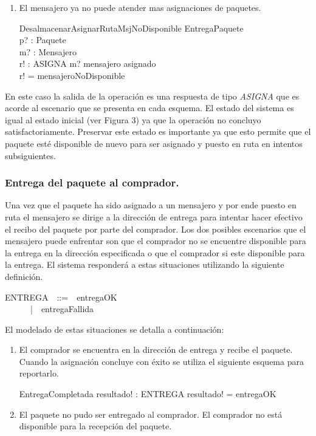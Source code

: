 \documentclass[12pt,a4paper]{article}
\begin{document}
\begin{enumerate}
\begin{enumerate}
\item El mensajero ya no puede atender mas asignaciones de paquetes.
\begin{schema}{DesalmacenarAsignarRutaMsjNoDisponible}
\Xi EntregaPaquete\\
p? : Paquete\\
m? : Mensajero\\
r! : ASIGNA
\where
m? \notin mensajero \setminus \ran asignado\\
r! = mensajeroNoDisponible
\end{schema}

\end{enumerate}
\end{enumerate}

En este caso la salida de la operación es una respuesta de tipo \textit{ASIGNA} que es acorde al escenario que se presenta en cada esquema. El estado del sistema es igual al estado inicial (ver Figura 3) ya que la operación no concluyo satisfactoriamente. Preservar este estado es importante ya que esto permite que el paquete esté disponible de nuevo para ser asignado y puesto en ruta en intentos subsiguientes.

\subsubsection{Entrega del paquete al comprador.}
Una vez que el paquete ha sido asignado a un mensajero y por ende puesto en ruta el mensajero se dirige a la dirección de entrega para intentar hacer efectivo el recibo del paquete por parte del comprador. Los dos posibles escenarios que el mensajero puede enfrentar son que el comprador no se encuentre disponible para la entrega en la dirección especificada o que el comprador si este disponible para la entrega. El sistema responderá a estas situaciones utilizando la siguiente definición.

\begin{zed}
ENTREGA~~::=~~entregaOK\\
~~~~~~|~~entregaFallida
\end{zed}

El modelado de estas situaciones se detalla a continuación:

\begin{enumerate}
\item El comprador se encuentra en la dirección de entrega y recibe el paquete. Cuando la asignación concluye con éxito se utiliza el siguiente esquema para reportarlo.

\begin{schema}{EntregaCompletada}
resultado! : ENTREGA
\where
resultado! = entregaOK
\end{schema}

\item El paquete no pudo ser entregado al comprador. El comprador no está disponible para la recepción del paquete.
\end{enumerate}
\end{document}

